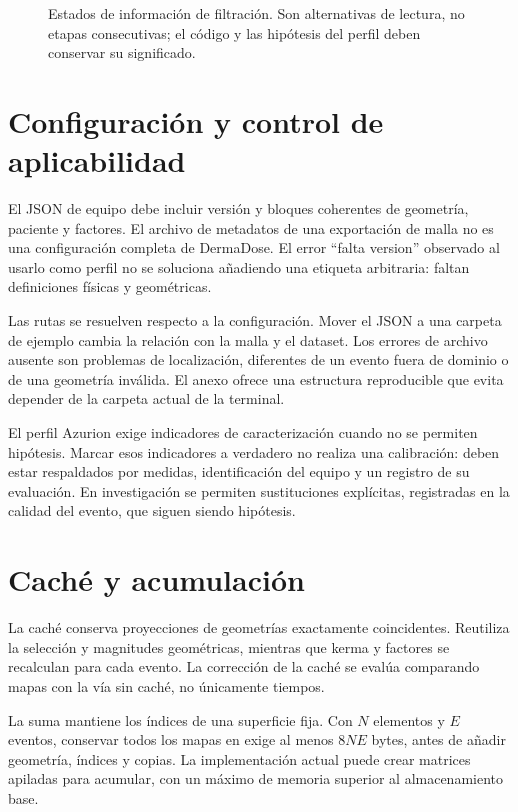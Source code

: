 \begin{figure}[htbp]\centering
\caption{Estados de información de filtración. Son alternativas de lectura, no etapas consecutivas; el código y las hipótesis del perfil deben conservar su significado.}\label{fig:estados_filtro}\end{figure}

\section{Configuración y control de aplicabilidad}
El JSON de equipo debe incluir versión y bloques coherentes de geometría, paciente y factores. El archivo de metadatos de una exportación de malla no es una configuración completa de DermaDose. El error ``falta version'' observado al usarlo como perfil no se soluciona añadiendo una etiqueta arbitraria: faltan definiciones físicas y geométricas.

Las rutas se resuelven respecto a la configuración. Mover el JSON a una carpeta de ejemplo cambia la relación con la malla y el dataset. Los errores de archivo ausente son problemas de localización, diferentes de un evento fuera de dominio o de una geometría inválida. El anexo ofrece una estructura reproducible que evita depender de la carpeta actual de la terminal.

El perfil Azurion exige indicadores de caracterización cuando no se permiten hipótesis. Marcar esos indicadores a verdadero no realiza una calibración: deben estar respaldados por medidas, identificación del equipo y un registro de su evaluación. En investigación se permiten sustituciones explícitas, registradas en la calidad del evento, que siguen siendo hipótesis.

\section{Caché y acumulación}
La caché conserva proyecciones de geometrías exactamente coincidentes. Reutiliza la selección y magnitudes geométricas, mientras que kerma y factores se recalculan para cada evento. La corrección de la caché se evalúa comparando mapas con la vía sin caché, no únicamente tiempos.

La suma mantiene los índices de una superficie fija. Con $N$ elementos y $E$ eventos, conservar todos los mapas en  exige al menos $8NE$ bytes, antes de añadir geometría, índices y copias. La implementación actual puede crear matrices apiladas para acumular, con un máximo de memoria superior al almacenamiento base.

